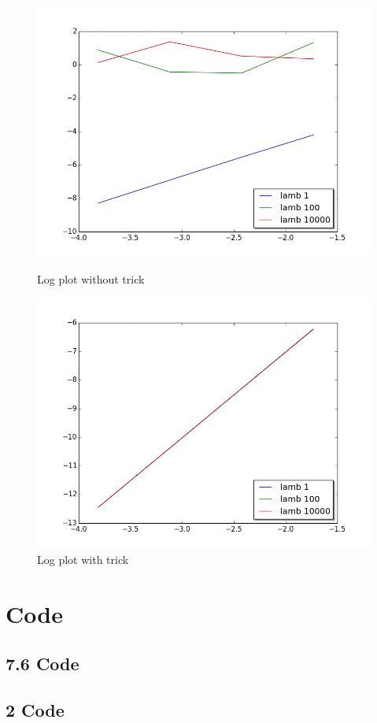 \documentclass[a4paper,norsk]{article}
\begin{document}
\begin{figure}[h!]
    \centering
    \includegraphics[scale=0.4]{log_plot_bad.png}   
    \caption{Log plot without trick}
    \label{fig:awesome_image}
    \includegraphics[scale=0.4]{log_plot_good.png}
    \caption{Log plot with trick}
    \label{fig:awesome_image}
\end{figure}
\newpage
\section*{Code}
\subsection*{7.6 Code}

\newpage
\subsection*{2 Code}

\end{document}
